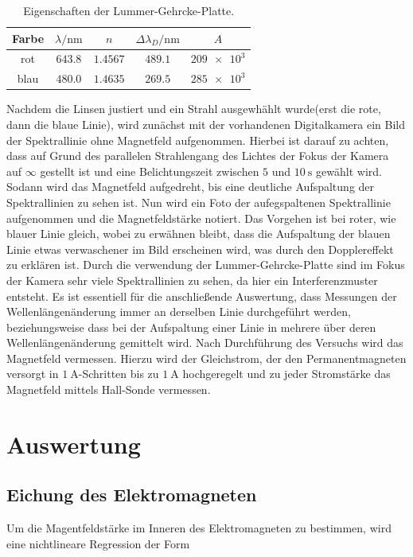\begin{table}
    \centering
    \begin{tabular}{ccccc}
		\toprule
		Farbe & $\lambda/\si{\nano\meter}$& $n$ & $\Delta\lambda_D/\si{\nano\meter}$& $A$\\\midrule
		rot & $\num{643,8}$ & $\num{1,4567}$ & $\num{489,1}$ & $\num{209e3}$\\
		blau & $\num{480,0}$& $\num{1,4635}$ & $\num{269,5}$ & $\num{285e3}$\\\bottomrule
\end{tabular}
    \caption{Eigenschaften der Lummer-Gehrcke-Platte.}
    \label{tab3}
\end{table}

\noindent Nachdem die Linsen justiert und ein Strahl ausgewhählt wurde(erst die rote,
dann die blaue Linie), wird zunächst
mit der vorhandenen Digitalkamera ein Bild der Spektrallinie ohne Magnetfeld aufgenommen.
Hierbei ist darauf zu achten, dass auf Grund des parallelen Strahlengang des Lichtes der
Fokus der Kamera auf $\infty$ gestellt ist und eine Belichtungszeit zwischen $5$ und
$\SI{10}{\second}$ gewählt wird.
Sodann wird das Magnetfeld aufgedreht, bis eine deutliche Aufspaltung der Spektrallinien
zu sehen ist. Nun wird ein Foto der aufegspaltenen Spektrallinie aufgenommen und die Magnetfeldstärke
notiert. Das Vorgehen ist bei roter, wie blauer Linie gleich, wobei zu erwähnen bleibt, dass die
Aufspaltung der blauen Linie etwas verwaschener im Bild erscheinen wird, was durch den Dopplereffekt
zu erklären ist.
Durch die verwendung der Lummer-Gehrcke-Platte sind im Fokus der Kamera sehr viele Spektrallinien zu sehen,
da hier ein Interferenzmuster entsteht. Es ist essentiell für die anschließende Auswertung, dass Messungen
der Wellenlängenänderung immer an derselben Linie durchgeführt werden, beziehungsweise dass bei der
Aufspaltung einer Linie in mehrere über deren Wellenlängenänderung gemittelt wird.
Nach Durchführung des Versuchs wird das Magnetfeld vermessen. Hierzu wird der Gleichstrom,
der den Permanentmagneten versorgt in $\SI{1}{\ampere}$-Schritten bis zu $\SI{1}{\ampere}$ hochgeregelt und zu
jeder Stromstärke das Magnetfeld mittels Hall-Sonde vermessen.



\section{Auswertung}
\subsection{Eichung des Elektromagneten}
Um die Magentfeldstärke im Inneren des Elektromagneten zu bestimmen, wird eine nichtlineare Regression der Form


